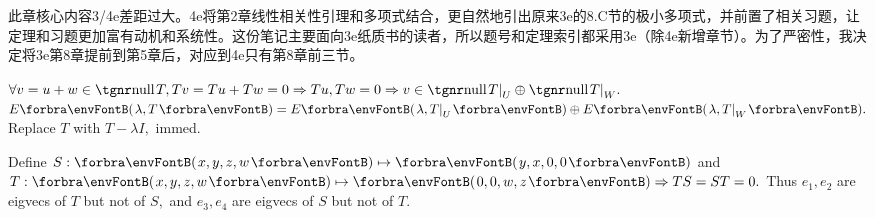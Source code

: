 {\small
此章核心内容3/4e差距过大。4e将第2章线性相关性引理和多项式结合，更自然地引出原来3e的8.C节的极小多项式，并前置了相关习题，让定理和习题更加富有动机和系统性。这份笔记主要面向3e纸质书的读者，所以题号和定理索引都采用3e（除4e新增章节）。为了严密性，我决定将3e第8章提前到第5章后，对应到4e只有第8章前三节。\par\vspace{14pt}
}\pagebreak


\vspace{4pt}


$\forall v=u+w\in\null T, Tv=Tu+Tw=0\Rightarrow Tu,Tw=0\Rightarrow v\in\null T\mmid_U\oplus\null T\mmid_W.$\PfEnd
\ACoro $E\Par{\lambda,T}=E\Par{\lambda,T\mmid_U}\oplus E\Par{\lambda,T\mmid_W}.$ Replace $T$ with $T-\lambda I,$ immed.
\SepLine

\SepLine

Define $S:\Par{x,y,z,w}\mapsto\Par{y,x,0,0}$ and $T:\Par{x,y,z,w}\mapsto\Par{0,0,w,z}\Rightarrow TS=ST=0.$\parSol{}
Thus ${e_1,e_2}$ are eigvecs of $T$ but not of $S,$ and ${e_3,e_4}$ are eigvecs of $S$ but not of $T.$
\SepLine


